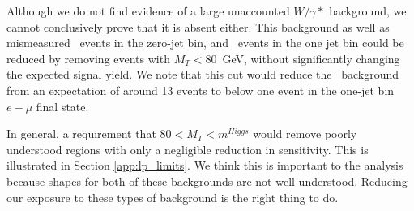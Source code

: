 Although we do not find evidence of a large unaccounted $W/\gamma*$ background,
we cannot conclusively prove that it is absent either.
This background as well as mismeasured \dyll~events in the zero-jet bin, and
\dytt~events in the one jet bin could be reduced by removing events with $M_T < 80$~GeV,
without significantly changing the expected signal yield.
We note that this cut would reduce the \dytt~background from an expectation
of around 13 events to below one event in the one-jet bin $e-\mu$ final state.

In general, a requirement that $80 < M_T < m^{Higgs}$ would remove poorly
understood regions with only a negligible reduction in sensitivity.
This is illustrated in Section \ref{app:lp_limits}.
We think this is important to the analysis because shapes for both of
these backgrounds are not well understood. Reducing our exposure to these types of 
background is the right thing to do.

